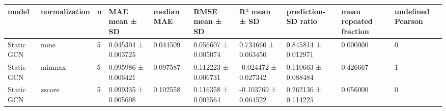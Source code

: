 \begin{tabular}{llllllllll}
\hline
model & normalization & n & MAE mean ± SD & median MAE & RMSE mean ± SD & R² mean ± SD & prediction-SD ratio & mean repeated fraction & undefined Pearson \\
\hline
Static GCN & none & 5 & 0.045304 ± 0.003725 & 0.044509 & 0.056607 ± 0.005074 & 0.734660 ± 0.063450 & 0.845814 ± 0.012971 & 0.000000 & 0 \\
Static GCN & minmax & 5 & 0.095986 ± 0.006421 & 0.097587 & 0.112223 ± 0.006731 & -0.024472 ± 0.027342 & 0.110663 ± 0.088484 & 0.426667 & 1 \\
Static GCN & zscore & 5 & 0.099335 ± 0.005608 & 0.102558 & 0.116358 ± 0.005564 & -0.103769 ± 0.064522 & 0.262136 ± 0.114225 & 0.056000 & 0 \\
\hline
\end{tabular}
